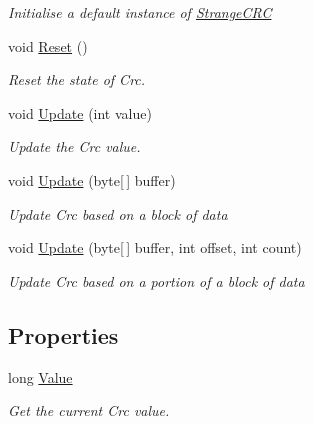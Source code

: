 \begin{DoxyCompactItemize}
\begin{DoxyCompactList}\small\item\em Initialise a default instance of \hyperlink{class_i_c_sharp_code_1_1_sharp_zip_lib_1_1_checksums_1_1_strange_c_r_c}{Strange\+C\+RC} \end{DoxyCompactList}\item 
void \hyperlink{class_i_c_sharp_code_1_1_sharp_zip_lib_1_1_checksums_1_1_strange_c_r_c_aca2448f26ffa4b9350696a62352b6673}{Reset} ()
\begin{DoxyCompactList}\small\item\em Reset the state of Crc. \end{DoxyCompactList}\item 
void \hyperlink{class_i_c_sharp_code_1_1_sharp_zip_lib_1_1_checksums_1_1_strange_c_r_c_a23b221cea3b706bd2e7c9fb8afb5786b}{Update} (int value)
\begin{DoxyCompactList}\small\item\em Update the Crc value. \end{DoxyCompactList}\item 
void \hyperlink{class_i_c_sharp_code_1_1_sharp_zip_lib_1_1_checksums_1_1_strange_c_r_c_aab01b02459d969f26576d15ac7cf3924}{Update} (byte\mbox{[}$\,$\mbox{]} buffer)
\begin{DoxyCompactList}\small\item\em Update Crc based on a block of data \end{DoxyCompactList}\item 
void \hyperlink{class_i_c_sharp_code_1_1_sharp_zip_lib_1_1_checksums_1_1_strange_c_r_c_a7be42e910338b16cfdea59bfcc8755df}{Update} (byte\mbox{[}$\,$\mbox{]} buffer, int offset, int count)
\begin{DoxyCompactList}\small\item\em Update Crc based on a portion of a block of data \end{DoxyCompactList}\end{DoxyCompactItemize}
\subsection*{Properties}
\begin{DoxyCompactItemize}
\item 
long \hyperlink{class_i_c_sharp_code_1_1_sharp_zip_lib_1_1_checksums_1_1_strange_c_r_c_a76e9220c65a94f8937ff534e60255fb6}{Value}
\begin{DoxyCompactList}\small\item\em Get the current Crc value. \end{DoxyCompactList}\end{DoxyCompactItemize}


